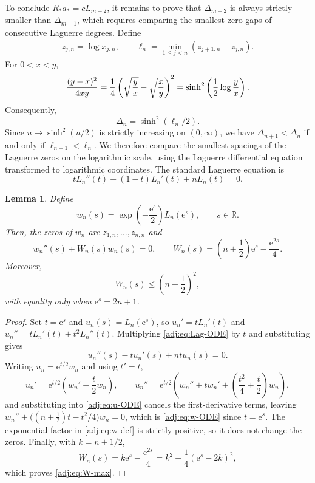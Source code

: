\documentclass[11pt]{article}
\numberwithin{equation}{section}
\newtheorem{lemma}[theorem]{Lemma}
\theoremstyle{definition}
\theoremstyle{remark}
\newcommand{\R}{\mathbb R}
\newcommand{\Lag}{L}
\newcommand{\e}{\mathrm e}
\begin{document}
To conclude $R_*a_*=c\Lag_{m+2}$, it remains to prove that $\Delta_{m+2}$ is always strictly smaller than $\Delta_{m+1}$, which requires comparing the smallest zero-gaps of consecutive Laguerre degrees. Define
\begin{align*}
 z_{j,n}=\log x_{j,n},
 \qquad
 \ell_n=\min_{1\leq j<n}(z_{j+1,n}-z_{j,n}).
\end{align*}
For $0<x<y$,
\begin{align*}
 \frac{(y-x)^2}{4xy}
 =\frac14\left(\sqrt{\frac yx}-\sqrt{\frac xy}\right)^2\notag
 =\sinh^2\left(\frac12\log\frac yx\right).
\end{align*}
Consequently,
\begin{equation}\label{adj:eq:Delta-ell}
 \Delta_n=\sinh^2(\ell_n/2).
\end{equation}
Since $u\mapsto\sinh^2(u/2)$ is strictly increasing on $(0,\infty)$, we have
$\Delta_{n+1}<\Delta_n$ if and only if $\ell_{n+1}<\ell_n$.
We therefore compare the smallest spacings of the Laguerre zeros on the logarithmic scale, using the Laguerre differential equation transformed to logarithmic coordinates. The standard Laguerre equation is
\begin{equation}\label{adj:eq:Lag-ODE}
 t\Lag_n''(t)+(1-t)\Lag_n'(t)+n\Lag_n(t)=0.
\end{equation}

\begin{lemma}\label{adj:lem:log-normal}
Define
\begin{equation}\label{adj:eq:w-def}
 w_n(s)=\exp\left(-\frac{\e^s}{2}\right)\Lag_n(\e^s),
 \qquad s\in\R.
\end{equation}
Then, the zeros of $w_n$ are $z_{1,n},\ldots,z_{n,n}$ and
\begin{equation}\label{adj:eq:w-ODE}
 w_n''(s)+W_n(s)w_n(s)=0,
 \qquad
 W_n(s)=\left(n+\frac12\right)\e^s-\frac{\e^{2s}}4.
\end{equation}
Moreover,
\begin{equation}\label{adj:eq:W-max}
 W_n(s)\leq\left(n+\frac12\right)^2,
\end{equation}
with equality only when $\e^s=2n+1$.
\end{lemma}
\begin{proof}
Set $t=\e^s$ and $u_n(s)=\Lag_n(\e^s)$, so $u_n'=t\Lag_n'(t)$ and $u_n''=t\Lag_n'(t)+t^2\Lag_n''(t)$. Multiplying \eqref{adj:eq:Lag-ODE} by $t$ and substituting gives
\begin{equation}\label{adj:eq:u-ODE}
 u_n''(s)-t u_n'(s)+nt u_n(s)=0.
\end{equation}
Writing $u_n=\e^{t/2}w_n$ and using $t'=t$,
\[
 u_n'=\e^{t/2}\left(w_n'+\frac t2w_n\right),
 \qquad
 u_n''=\e^{t/2}\left(w_n''+t w_n'+\left(\frac{t^2}{4}+\frac t2\right)w_n\right),
\]
and substituting into \eqref{adj:eq:u-ODE} cancels the first-derivative terms, leaving $w_n''+\bigl((n+\tfrac12)t-t^2/4\bigr)w_n=0$, which is \eqref{adj:eq:w-ODE} since $t=\e^s$. The exponential factor in \eqref{adj:eq:w-def} is strictly positive, so it does not change the zeros. Finally, with $k=n+1/2$,
\[
 W_n(s)=k\e^s-\frac{\e^{2s}}4=k^2-\frac14(\e^s-2k)^2,
\]
which proves \eqref{adj:eq:W-max}.
\end{proof}
\end{document}
